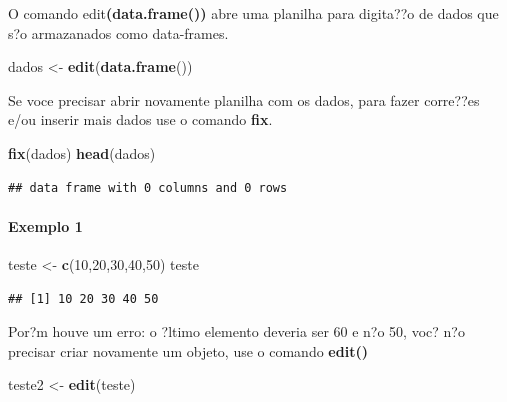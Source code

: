 \documentclass[]{book}
\newenvironment{Shaded}{\begin{snugshade}}{\end{snugshade}}
\newcommand{\DecValTok}[1]{\textcolor[rgb]{0.00,0.00,0.81}{#1}}
\newcommand{\KeywordTok}[1]{\textcolor[rgb]{0.13,0.29,0.53}{\textbf{#1}}}
\newcommand{\NormalTok}[1]{#1}
\newcommand{\StringTok}[1]{\textcolor[rgb]{0.31,0.60,0.02}{#1}}
\let\oldparagraph\paragraph
\renewcommand{\paragraph}[1]{\oldparagraph{#1}\mbox{}}
\begin{document}
O comando edit\textbf{(data.frame())} abre uma planilha para digita??o de dados que s?o armazanados como data-frames.

\begin{Shaded}
\begin{Highlighting}[]
\NormalTok{dados <-}\StringTok{ }\KeywordTok{edit}\NormalTok{(}\KeywordTok{data.frame}\NormalTok{())}
\end{Highlighting}
\end{Shaded}

Se voce precisar abrir novamente planilha com os dados, para fazer corre??es e/ou inserir mais dados use o comando \textbf{fix}.

\begin{Shaded}
\begin{Highlighting}[]
\KeywordTok{fix}\NormalTok{(dados)}
\KeywordTok{head}\NormalTok{(dados)}
\end{Highlighting}
\end{Shaded}

\begin{verbatim}
## data frame with 0 columns and 0 rows
\end{verbatim}

\hypertarget{exemplo-1}{%
\paragraph{Exemplo 1}\label{exemplo-1}}

\begin{Shaded}
\begin{Highlighting}[]
\NormalTok{teste <-}\StringTok{ }\KeywordTok{c}\NormalTok{(}\DecValTok{10}\NormalTok{,}\DecValTok{20}\NormalTok{,}\DecValTok{30}\NormalTok{,}\DecValTok{40}\NormalTok{,}\DecValTok{50}\NormalTok{)}
\NormalTok{teste}
\end{Highlighting}
\end{Shaded}

\begin{verbatim}
## [1] 10 20 30 40 50
\end{verbatim}

Por?m houve um erro: o ?ltimo elemento deveria ser 60 e n?o 50, voc? n?o precisar criar novamente um objeto, use o comando \textbf{edit()}

\begin{Shaded}
\begin{Highlighting}[]
\NormalTok{teste2 <-}\StringTok{ }\KeywordTok{edit}\NormalTok{(teste)}
\end{Highlighting}
\end{Shaded}
\end{document}
